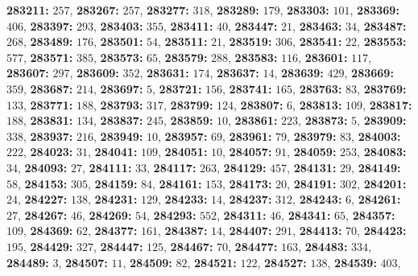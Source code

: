 \textsf{\bfseries 283211:} $257$, \textsf{\bfseries 283267:} $257$, \textsf{\bfseries 283277:} $318$, \textsf{\bfseries 283289:} $179$, \textsf{\bfseries 283303:} $101$, \textsf{\bfseries 283369:} $406$, \textsf{\bfseries 283397:} $293$, \textsf{\bfseries 283403:} $355$, \textsf{\bfseries 283411:} $40$, \textsf{\bfseries 283447:} $21$, \textsf{\bfseries 283463:} $34$, \textsf{\bfseries 283487:} $268$, \textsf{\bfseries 283489:} $176$, \textsf{\bfseries 283501:} $54$, \textsf{\bfseries 283511:} $21$, \textsf{\bfseries 283519:} $306$, \textsf{\bfseries 283541:} $22$, \textsf{\bfseries 283553:} $577$, \textsf{\bfseries 283571:} $385$, \textsf{\bfseries 283573:} $65$, \textsf{\bfseries 283579:} $288$, \textsf{\bfseries 283583:} $116$, \textsf{\bfseries 283601:} $117$, \textsf{\bfseries 283607:} $297$, \textsf{\bfseries 283609:} $352$, \textsf{\bfseries 283631:} $174$, \textsf{\bfseries 283637:} $14$, \textsf{\bfseries 283639:} $429$, \textsf{\bfseries 283669:} $359$, \textsf{\bfseries 283687:} $214$, \textsf{\bfseries 283697:} $5$, \textsf{\bfseries 283721:} $156$, \textsf{\bfseries 283741:} $165$, \textsf{\bfseries 283763:} $83$, \textsf{\bfseries 283769:} $133$, \textsf{\bfseries 283771:} $188$, \textsf{\bfseries 283793:} $317$, \textsf{\bfseries 283799:} $124$, \textsf{\bfseries 283807:} $6$, \textsf{\bfseries 283813:} $109$, \textsf{\bfseries 283817:} $188$, \textsf{\bfseries 283831:} $134$, \textsf{\bfseries 283837:} $245$, \textsf{\bfseries 283859:} $10$, \textsf{\bfseries 283861:} $223$, \textsf{\bfseries 283873:} $5$, \textsf{\bfseries 283909:} $338$, \textsf{\bfseries 283937:} $216$, \textsf{\bfseries 283949:} $10$, \textsf{\bfseries 283957:} $69$, \textsf{\bfseries 283961:} $79$, \textsf{\bfseries 283979:} $83$, \textsf{\bfseries 284003:} $222$, \textsf{\bfseries 284023:} $31$, \textsf{\bfseries 284041:} $109$, \textsf{\bfseries 284051:} $10$, \textsf{\bfseries 284057:} $91$, \textsf{\bfseries 284059:} $253$, \textsf{\bfseries 284083:} $34$, \textsf{\bfseries 284093:} $27$, \textsf{\bfseries 284111:} $33$, \textsf{\bfseries 284117:} $263$, \textsf{\bfseries 284129:} $457$, \textsf{\bfseries 284131:} $29$, \textsf{\bfseries 284149:} $58$, \textsf{\bfseries 284153:} $305$, \textsf{\bfseries 284159:} $84$, \textsf{\bfseries 284161:} $153$, \textsf{\bfseries 284173:} $20$, \textsf{\bfseries 284191:} $302$, \textsf{\bfseries 284201:} $24$, \textsf{\bfseries 284227:} $138$, \textsf{\bfseries 284231:} $129$, \textsf{\bfseries 284233:} $14$, \textsf{\bfseries 284237:} $312$, \textsf{\bfseries 284243:} $6$, \textsf{\bfseries 284261:} $27$, \textsf{\bfseries 284267:} $46$, \textsf{\bfseries 284269:} $54$, \textsf{\bfseries 284293:} $552$, \textsf{\bfseries 284311:} $46$, \textsf{\bfseries 284341:} $65$, \textsf{\bfseries 284357:} $109$, \textsf{\bfseries 284369:} $62$, \textsf{\bfseries 284377:} $161$, \textsf{\bfseries 284387:} $14$, \textsf{\bfseries 284407:} $291$, \textsf{\bfseries 284413:} $70$, \textsf{\bfseries 284423:} $195$, \textsf{\bfseries 284429:} $327$, \textsf{\bfseries 284447:} $125$, \textsf{\bfseries 284467:} $70$, \textsf{\bfseries 284477:} $163$, \textsf{\bfseries 284483:} $334$, \textsf{\bfseries 284489:} $3$, \textsf{\bfseries 284507:} $11$, \textsf{\bfseries 284509:} $82$, \textsf{\bfseries 284521:} $122$, \textsf{\bfseries 284527:} $138$, \textsf{\bfseries 284539:} $403$, 
